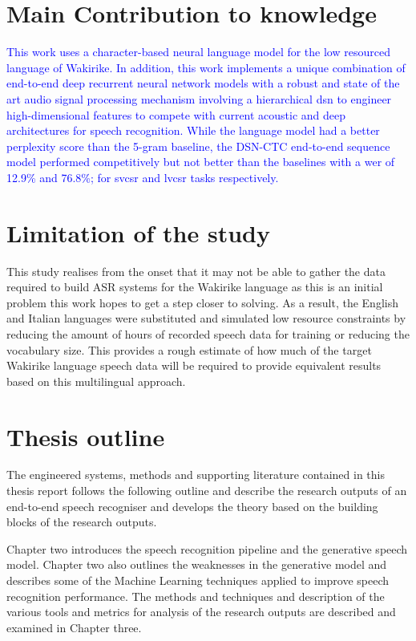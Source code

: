 \section{Main Contribution to knowledge}
\textcolor{blue}{This work uses a character-based neural language model for the low resourced language of Wakirike.  In addition, this work implements a unique combination of end-to-end deep recurrent neural network models with a robust and state of the art audio signal processing mechanism involving a hierarchical \acrfull{dsn} to engineer high-dimensional features to compete with current acoustic and deep architectures for speech recognition. While the language model had a better perplexity score than the 5-gram baseline, the DSN-CTC end-to-end sequence model performed competitively but not better than the baselines with a \acrlong{wer} of 12.9\% and 76.8\%; for \acrshort{svcsr} and \acrshort{lvcsr} tasks respectively.}

\startblue
\section{Limitation of the study}
This study realises from the onset that it may not be able to gather the data required to build ASR systems for the Wakirike language as this is an initial problem this work hopes to get a step closer to solving.  As a result, the English and Italian languages were substituted and simulated low resource constraints by reducing the amount of hours of recorded speech data for training or reducing the vocabulary size.  This provides a rough estimate of how much of the target Wakirike language speech data will be required to provide equivalent results based on this multilingual approach.
\stopblue

\section{Thesis outline}
The engineered systems, methods and supporting literature contained in this thesis report follows the following outline and describe the research outputs of an end-to-end speech recogniser and develops the theory based on the building blocks of the research outputs.

Chapter two introduces the speech recognition pipeline and the generative speech model.  Chapter two also outlines the weaknesses in the generative model and describes some of the Machine Learning techniques applied to improve speech recognition performance.  The methods and techniques and description of the various tools and metrics for analysis of the research outputs are described and examined in Chapter three.

